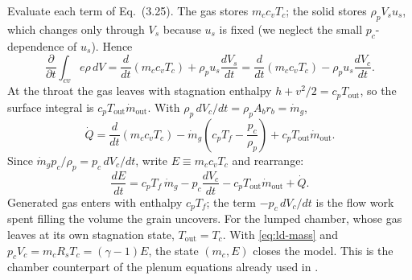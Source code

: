 Evaluate each term of Eq.~(3.25). The gas stores $m_cc_vT_c$; the solid
stores $\rho_pV_su_s$, which changes only through $V_s$ because $u_s$
is fixed (we neglect the small $p_c$-dependence of $u_s$). Hence
\[
 \frac{\partial}{\partial t}\int_{cv}e\rho\,dV
 =\frac{d}{dt}(m_cc_vT_c)+\rho_pu_s\frac{dV_s}{dt}
 =\frac{d}{dt}(m_cc_vT_c)-\rho_pu_s\frac{dV_c}{dt}.
\]
At the throat the gas leaves with stagnation enthalpy
$h+v^2/2=c_pT_{\mathrm{out}}$, so the surface integral is
$c_pT_{\mathrm{out}}\dot m_{\mathrm{out}}$. With
$\rho_p\,dV_c/dt=\rho_pA_br_b=\dot m_g$,
\[
 \dot Q=\frac{d}{dt}(m_cc_vT_c)
        -\dot m_g\left(c_pT_f-\frac{p_c}{\rho_p}\right)
        +c_pT_{\mathrm{out}}\dot m_{\mathrm{out}} .
\]
Since $\dot m_gp_c/\rho_p=p_c\,dV_c/dt$, write
$E\equiv m_cc_vT_c$ and rearrange:
\begin{equation}\label{eq:ld-energy}
 \boxed{\frac{dE}{dt}=c_pT_f\,\dot m_g-p_c\frac{dV_c}{dt}
        -c_pT_{\mathrm{out}}\dot m_{\mathrm{out}}+\dot Q .}
\end{equation}
Generated gas enters with enthalpy $c_pT_f$; the term $-p_c\,dV_c/dt$
is the flow work spent filling the volume the grain uncovers. For the
lumped chamber, whose gas leaves at its own stagnation state,
$T_{\mathrm{out}}=T_c$. With \eqref{eq:ld-mass} and
$p_cV_c=m_cR_sT_c=(\gamma-1)E$, the state $(m_c,E)$ closes the model.
This is the chamber counterpart of the plenum equations already used in
.

